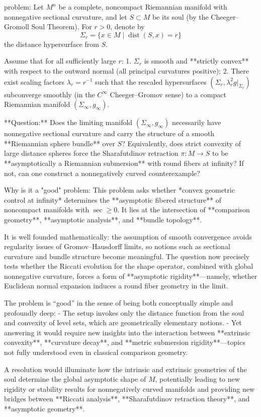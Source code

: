 problem:  
Let \(M^n\) be a complete, noncompact Riemannian manifold with nonnegative sectional curvature, and let \(S \subset M\) be its soul (by the Cheeger–Gromoll Soul Theorem).  
For \(r > 0\), denote by  
\[
\Sigma_r = \{ x \in M \mid \operatorname{dist}(S,x) = r \}
\]
the distance hypersurface from \(S\).  

Assume that for all sufficiently large \(r\):  
1. \(\Sigma_r\) is smooth and **strictly convex** with respect to the outward normal (all principal curvatures positive);  
2. There exist scaling factors \(\lambda_r = r^{-1}\) such that the rescaled hypersurfaces \((\Sigma_r, \lambda_r^2 g|_{\Sigma_r})\) subconverge smoothly (in the \(C^\infty\) Cheeger–Gromov sense) to a compact Riemannian manifold \((\Sigma_\infty, g_\infty)\).  

**Question:**  
Does the limiting manifold \((\Sigma_\infty, g_\infty)\) necessarily have nonnegative sectional curvature and carry the structure of a smooth **Riemannian sphere bundle** over \(S\)?  
Equivalently, does strict convexity of large distance spheres force the Sharafutdinov retraction \(\pi : M \to S\) to be **asymptotically a Riemannian submersion** with round fibers at infinity?  
If not, can one construct a nonnegatively curved counterexample?  

Why is it a "good" problem:  
This problem asks whether *convex geometric control at infinity* determines the **asymptotic fibered structure** of noncompact manifolds with \(\sec \ge 0\). It lies at the intersection of **comparison geometry**, **asymptotic analysis**, and **bundle topology**.  

It is well founded mathematically: the assumption of smooth convergence avoids regularity issues of Gromov–Hausdorff limits, so notions such as sectional curvature and bundle structure become meaningful. The question now precisely tests whether the Riccati evolution for the shape operator, combined with global nonnegative curvature, forces a form of **asymptotic rigidity**—namely, whether Euclidean normal expansion induces a round fiber geometry in the limit.  

The problem is “good” in the sense of being both conceptually simple and profoundly deep:
- The setup invokes only the distance function from the soul and convexity of level sets, which are geometrically elementary notions.
- Yet answering it would require new insights into the interaction between **extrinsic convexity**, **curvature decay**, and **metric submersion rigidity**—topics not fully understood even in classical comparison geometry.
  
A resolution would illuminate how the intrinsic and extrinsic geometries of the soul determine the global asymptotic shape of \(M\), potentially leading to new rigidity or stability results for nonnegatively curved manifolds and providing new bridges between **Riccati analysis**, **Sharafutdinov retraction theory**, and **asymptotic geometry**.